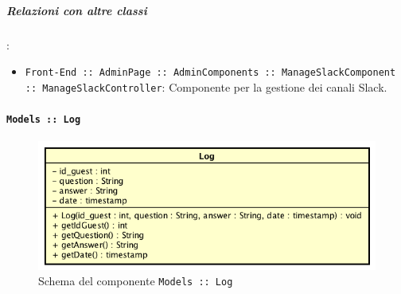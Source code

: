 \documentclass[../DefinizioneDiProdotto_v3.0.0.tex]{subfiles}
\begin{document}
			\subparagraph{Relazioni con altre classi}:
			\begin{itemize}
				\item \texttt{Front-End :: AdminPage :: AdminComponents :: ManageSlackComponent :: ManageSlackController}: Componente per la gestione dei canali Slack.
			\end{itemize}


	\newpage
	\paragraph{\texttt{Models :: Log}}
	\acapo
	\begin{figure}[!h]
		\centering
		\includegraphics[scale=0.7]{Architettura/Front-End/Models/Log.png}
		\caption{Schema del componente \texttt{Models :: Log}}
	\end{figure}
\end{document}
